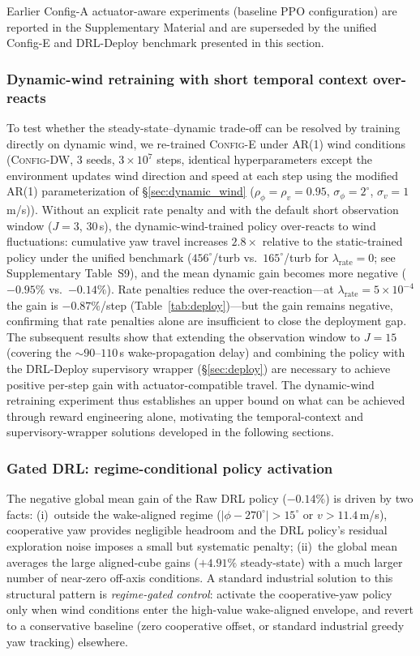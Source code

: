 \documentclass[final,5p,times]{elsarticle}
\begin{document}
Earlier Config-A actuator-aware experiments (baseline PPO configuration) are reported in the Supplementary Material and are superseded by the unified Config-E and DRL-Deploy benchmark presented in this section.

\subsubsection{Dynamic-wind retraining with short temporal context over-reacts}
To test whether the steady-state--dynamic trade-off can be resolved by training directly on dynamic wind, we re-trained \textsc{Config-E} under AR(1) wind conditions (\textsc{Config-DW}, 3 seeds, $3{\times}10^{7}$ steps, identical hyperparameters except the environment updates wind direction and speed at each step using the modified AR(1) parameterization of \S\ref{sec:dynamic_wind} ($\rho_\phi{=}\rho_v{=}0.95$, $\sigma_\phi{=}2^\circ$, $\sigma_v{=}1$\,m/s)). Without an explicit rate penalty and with the default short observation window ($J{=}3$, $30$\,s), the dynamic-wind-trained policy over-reacts to wind fluctuations: cumulative yaw travel increases $2.8{\times}$ relative to the static-trained policy under the unified benchmark ($456^\circ$/turb vs.\ $165^\circ$/turb for $\lambda_\mathrm{rate}{=}0$; see Supplementary Table~S9), and the mean dynamic gain becomes more negative ($-0.95\%$ vs.\ $-0.14\%$). Rate penalties reduce the over-reaction---at $\lambda_\mathrm{rate}{=}5{\times}10^{-4}$ the gain is $-0.87\%$/step (Table~\ref{tab:deploy})---but the gain remains negative, confirming that rate penalties alone are insufficient to close the deployment gap. The subsequent results show that extending the observation window to $J{=}15$ (covering the ${\sim}90$--$110$\,s wake-propagation delay) and combining the policy with the DRL-Deploy supervisory wrapper (\S\ref{sec:deploy}) are necessary to achieve positive per-step gain with actuator-compatible travel. The dynamic-wind retraining experiment thus establishes an upper bound on what can be achieved through reward engineering alone, motivating the temporal-context and supervisory-wrapper solutions developed in the following sections.

\subsubsection{Gated DRL: regime-conditional policy activation}\label{sec:gated_drl}

The negative global mean gain of the Raw DRL policy ($-0.14\%$) is driven by two facts: (i)~outside the wake-aligned regime ($|\phi{-}270^\circ|{>}15^\circ$ or $v{>}11.4$\,m/s), cooperative yaw provides negligible headroom and the DRL policy's residual exploration noise imposes a small but systematic penalty; (ii)~the global mean averages the large aligned-cube gains ($+4.91\%$ steady-state) with a much larger number of near-zero off-axis conditions. A standard industrial solution to this structural pattern is \emph{regime-gated control}: activate the cooperative-yaw policy only when wind conditions enter the high-value wake-aligned envelope, and revert to a conservative baseline (zero cooperative offset, or standard industrial greedy yaw tracking) elsewhere.
\end{document}
